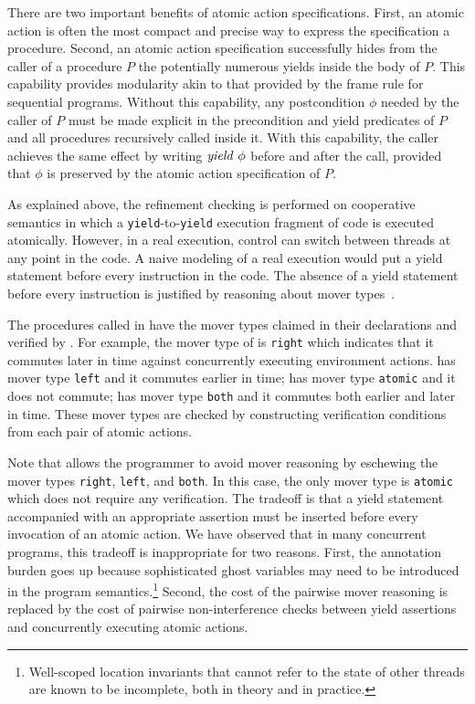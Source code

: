 There are two important benefits of atomic action specifications.
First, an atomic action is often the most compact and precise way to express the specification a procedure.
Second, an atomic action specification successfully hides from the caller of a procedure $P$
the potentially numerous yields inside the body of $P$.
This capability provides modularity akin to that provided by the frame rule for sequential programs.
Without this capability, any postcondition $\phi$ needed by the caller of $P$ must be made explicit in the precondition 
and yield predicates of $P$ and all procedures recursively called inside it.
With this capability, the caller achieves the same effect by writing $\mathit{yield}\ \phi$ before and after the call, 
provided that $\phi$ is preserved by the atomic action specification of $P$.

As explained above, the refinement checking is performed on cooperative semantics in which a 
{\tt yield}-to-{\tt yield} execution fragment of code is executed atomically.
However, in a real execution, control can switch between threads at any point in the code. 
A naive modeling of a real execution would put a yield statement before every instruction in the code.
The absence of a yield statement before every instruction is justified by reasoning about mover types~\cite{FlanaganFLQ08}. 

The procedures called in  have the mover types claimed in their
declarations and verified by \civl. 
For example, the mover type of  is {\tt right} which indicates 
that it commutes later in time against concurrently executing environment actions.
 has mover type {\tt left} and it commutes earlier in time;
 has mover type {\tt atomic} and it does not commute;
 has mover type {\tt both} and it commutes both earlier and later in time.
These mover types are checked by constructing verification conditions from each pair of atomic actions.

Note that \civl allows the programmer to avoid mover reasoning by eschewing
the mover types {\tt right}, {\tt left}, and {\tt both}.
In this case, the only mover type is {\tt atomic} which does not require any verification.
The tradeoff is that a yield statement accompanied with an appropriate assertion
must be inserted before every invocation of an atomic action.
We have observed that in many concurrent programs, this tradeoff is inappropriate for two reasons.
First, the annotation burden goes up because sophisticated ghost variables may need to be introduced in the 
program semantics.\footnote{Well-scoped location invariants that cannot refer to the state of other threads are known to be incomplete, 
both in theory and in practice.}
Second, the cost of the pairwise mover reasoning is replaced by the cost of pairwise non-interference checks between yield assertions 
and concurrently executing atomic actions.

